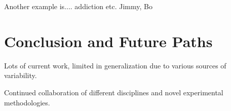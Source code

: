 \documentclass{article}
\begin{document}
Another example is.... addiction etc. Jimmy, Bo

\section{Conclusion and Future Paths}
Lots of current work, limited in generalization due to various sources of variability.

Continued collaboration of different disciplines and novel experimental methodologies.
\vfill\pagebreak



\end{document}
